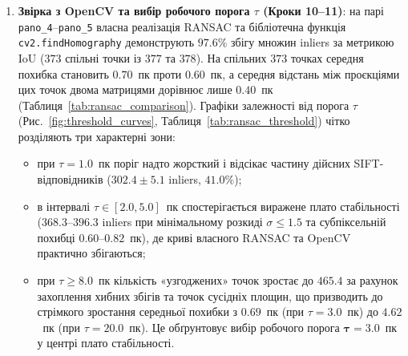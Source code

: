 \documentclass[14pt, a4paper]{extarticle}
\begin{document}
\begin{enumerate}
    \item \textbf{Звірка з OpenCV та вибір робочого порога $\tau$ (Кроки 10--11)}: на парі \texttt{pano\_4}--\texttt{pano\_5} власна реалізація RANSAC та бібліотечна функція \texttt{cv2.findHomography} демонструють $\mathbf{97.6\%}$ збігу множин inliers за метрикою IoU ($373$ спільні точки із $377$ та $378$). На спільних $373$ точках середня похибка становить $0.70$~пк проти $0.60$~пк, а середня відстань між проєкціями цих точок двома матрицями дорівнює лише $\mathbf{0.40}$~пк (Таблиця~\ref{tab:ransac_comparison}). Графіки залежності від порога $\tau$ (Рис.~\ref{fig:threshold_curves}, Таблиця~\ref{tab:ransac_threshold}) чітко розділяють три характерні зони:
    \begin{itemize}
        \item при $\tau = 1.0$~пк поріг надто жорсткий і відсікає частину дійсних SIFT-відповідників ($302.4 \pm 5.1$ inliers, $41.0\%$);
        \item в інтервалі $\tau \in [2.0, 5.0]$~пк спостерігається виражене плато стабільності ($368.3$--$396.3$ inliers при мінімальному розкиді $\sigma \le 1.5$ та субпіксельній похибці $0.60$--$0.82$~пк), де криві власного RANSAC та OpenCV практично збігаються;
        \item при $\tau \ge 8.0$~пк кількість «узгоджених» точок зростає до $465.4$ за рахунок захоплення хибних збігів та точок сусідніх площин, що призводить до стрімкого зростання середньої похибки з $0.69$~пк (при $\tau=3.0$~пк) до $4.62$~пк (при $\tau=20.0$~пк). Це обґрунтовує вибір робочого порога $\mathbf{\tau = 3.0}$~пк у центрі плато стабільності.
    \end{itemize}


\end{enumerate}
\end{document}
